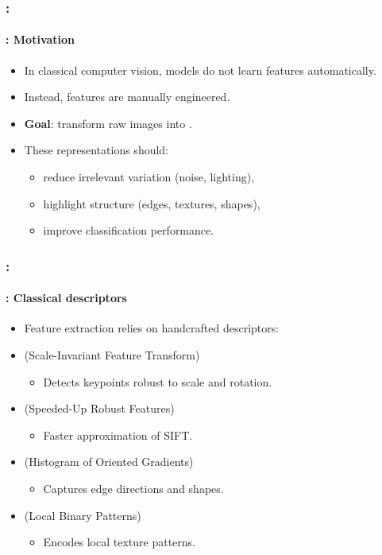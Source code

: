 \documentclass[xcolor=table]{beamer}
\begin{document}
\begin{frame}
	\frametitle{\insertshortsubtitle: \insertsection}
	\framesubtitle{\insertsubsection: Motivation}
	
	\begin{itemize}
		\item In classical computer vision, models do not learn features automatically.
		
		\item Instead, features are manually engineered.
		
		\item \textbf{Goal}: transform raw images into .
		
		\item These representations should:
		\begin{itemize}
			\item reduce irrelevant variation (noise, lighting),
			\item highlight structure (edges, textures, shapes),
			\item improve classification performance.
		\end{itemize}
		
	\end{itemize}
	
\end{frame}

\begin{frame}
	\frametitle{\insertshortsubtitle: \insertsection}
	\framesubtitle{\insertsubsection: Classical descriptors}
	
	\begin{itemize}
		\item Feature extraction relies on handcrafted descriptors:
		
		\item {} (Scale-Invariant Feature Transform)
		\begin{itemize}
			\item Detects keypoints robust to scale and rotation.
		\end{itemize}
		
		\item {} (Speeded-Up Robust Features)
		\begin{itemize}
			\item Faster approximation of SIFT.
		\end{itemize}
		
		\item {} (Histogram of Oriented Gradients)
		\begin{itemize}
			\item Captures edge directions and shapes.
		\end{itemize}
		
		\item {} (Local Binary Patterns)
		\begin{itemize}
			\item Encodes local texture patterns.
		\end{itemize}
		
	\end{itemize}
	
\end{frame}
\end{document}

